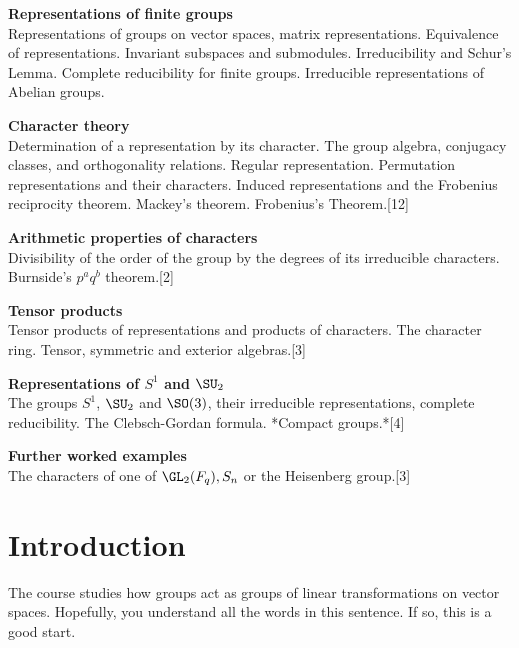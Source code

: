 \documentclass[a4paper]{article}
\begin{document}
\maketitle
{\small
\noindent\textbf{Representations of finite groups}\\
Representations of groups on vector spaces, matrix representations. Equivalence of representations. Invariant subspaces and submodules. Irreducibility and Schur's Lemma. Complete reducibility for finite groups. Irreducible representations of Abelian groups.

\vspace{10pt}
\noindent\textbf{Character theory}\\
Determination of a representation by its character. The group algebra, conjugacy classes, and orthogonality relations. Regular representation. Permutation representations and their characters. Induced representations and the Frobenius reciprocity theorem. Mackey's theorem. Frobenius's Theorem.\hspace*{\fill}[12]

\vspace{10pt}
\noindent\textbf{Arithmetic properties of characters}\\
Divisibility of the order of the group by the degrees of its irreducible characters. Burnside's $p^a q^b$ theorem.\hspace*{\fill}[2]

\vspace{10pt}
\noindent\textbf{Tensor products}\\
Tensor products of representations and products of characters. The character ring. Tensor, symmetric and exterior algebras.\hspace*{\fill}[3]

\vspace{10pt}
\noindent\textbf{Representations of $S^1$ and $\SU_2$}\\
The groups $S^1$, $\SU_2$ and $\SO(3)$, their irreducible representations, complete reducibility. The Clebsch-Gordan formula. *Compact groups.*\hspace*{\fill}[4]%

\vspace{10pt}
\noindent\textbf{Further worked examples}\\
The characters of one of $\GL_2(F_q), S_n$ or the Heisenberg group.\hspace*{\fill}[3]}

\tableofcontents
\setcounter{section}{-1}
\section{Introduction}
The course studies how groups act as groups of linear transformations on vector spaces. Hopefully, you understand all the words in this sentence. If so, this is a good start.
\end{document}
